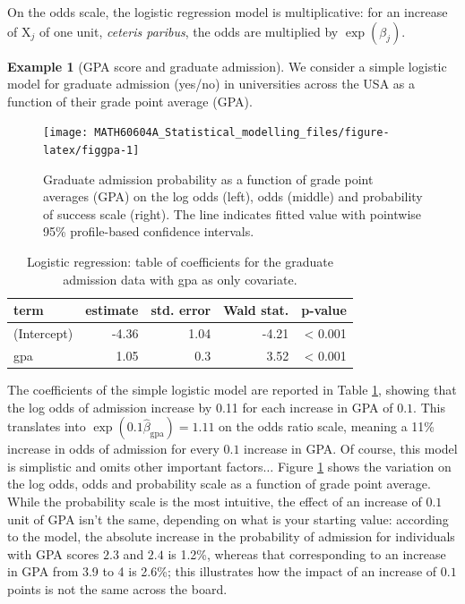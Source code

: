 \documentclass[
  11pt,
  letterpaper,
]{book}
\theoremstyle{definition}
\theoremstyle{definition}
\newtheorem{example}{Example}[chapter]
\theoremstyle{definition}
\theoremstyle{definition}
\theoremstyle{remark}
\begin{document}
On the odds scale, the logistic regression model is multiplicative: for an increase of \(\mathrm{X}_j\) of one unit, \emph{ceteris paribus}, the odds are multiplied by \(\exp(\beta_j)\).

\begin{example}[GPA score and graduate admission]
\protect\hypertarget{exm:gpaexample}{}{\label{exm:gpaexample} {} }We consider a simple logistic model for graduate admission (yes/no) in universities across the USA as a function of their grade point average (GPA).
\end{example}

\begin{figure}

{\centering \texttt{[image: MATH60604A\_Statistical\_modelling\_files/figure-latex/figgpa-1]} 

}

\caption{Graduate admission probability as a function of grade point averages (GPA) on the log odds (left), odds (middle) and probability of success scale (right). The line indicates fitted value with pointwise 95\% profile-based confidence intervals.}\label{fig:figgpa}
\end{figure}

\begin{table}

\caption{\label{tab:gpatable}Logistic regression: table of coefficients for the graduate admission data with gpa as only covariate.}
\centering
\begin{tabular}[t]{lrrrr}
\toprule
term & estimate & std. error & Wald stat. & p-value\\
\midrule
(Intercept) & -4.36 & 1.04 & -4.21 & < 0.001\\
gpa & 1.05 & 0.3 & 3.52 & < 0.001\\
\bottomrule
\end{tabular}
\end{table}

The coefficients of the simple logistic model are reported in Table \ref{tab:gpatable}, showing that the log odds of admission increase by 0.11 for each increase in GPA of \(0.1\). This translates into \(\exp(0.1\widehat{\beta}_{\mathrm{gpa}})=1.11\) on the odds ratio scale, meaning a 11\% increase in odds of admission for every \(0.1\) increase in GPA. Of course, this model is simplistic and omits other important factors\(\ldots\) Figure \ref{fig:figgpa} shows the variation on the log odds, odds and probability scale as a function of grade point average. While the probability scale is the most intuitive, the effect of an increase of \(0.1\) unit of GPA isn't the same, depending on what is your starting value: according to the model, the absolute increase in the probability of admission for individuals with GPA scores \(2.3\) and \(2.4\) is 1.2\%, whereas that corresponding to an increase in GPA from 3.9 to 4 is 2.6\%; this illustrates how the impact of an increase of \(0.1\) points is not the same across the board.
\end{document}
